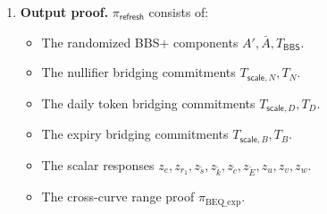 \documentclass[11pt]{article}
\theoremstyle{definitionstyle}
\theoremstyle{plain}
\begin{document}
\begin{enumerate}[leftmargin=*]
  \begin{align*}
    z_e &= \rho_e + c \cdot e_{\mathsf{sub}}, & z_{r_1} &= \rho_{r_1} + c \cdot r_1, \\
    z_{\tilde{s}} &= \rho_{\tilde{s}} + c \cdot \tilde{s}, & z_{\tilde{k}} &= \rho_{\tilde{k}} + c \cdot \tilde{k}, \\
    z_{\tilde{c}} &= \rho_{\tilde{c}} + c \cdot \tilde{c}, & z_{\tilde{E}} &= \rho_{\tilde{E}} + c \cdot \tilde{E}, \\
    z_u &= \rho_u + c \cdot (k_{\mathsf{daily}} r_1), & z_v &= \rho_v + c \cdot (r_{\mathsf{daily}} r_1), \\
    z_w &= \rho_w + c \cdot (r_{\Delta} r_1).
  \end{align*}
\item \textbf{Output proof.}
  $\pi_{\mathsf{refresh}}$ consists of:
  \begin{itemize}[leftmargin=*, nosep]
  \item The randomized BBS+ components $A', \bar{A}, T_{\mathsf{BBS}}$.
  \item The nullifier bridging commitments $T_{\mathsf{scale},N}, T_N$.
  \item The daily token bridging commitments $T_{\mathsf{scale},D}, T_D$.
  \item The expiry bridging commitments $T_{\mathsf{scale},B}, T_B$.
  \item The scalar responses $z_e, z_{r_1}, z_{\tilde{s}}, z_{\tilde{k}}, z_{\tilde{c}}, z_{\tilde{E}}, z_u, z_v, z_w$.
  \item The cross-curve range proof $\pi_{\text{BEQ\_exp}}$.
  \end{itemize}
\end{enumerate}
\end{document}
